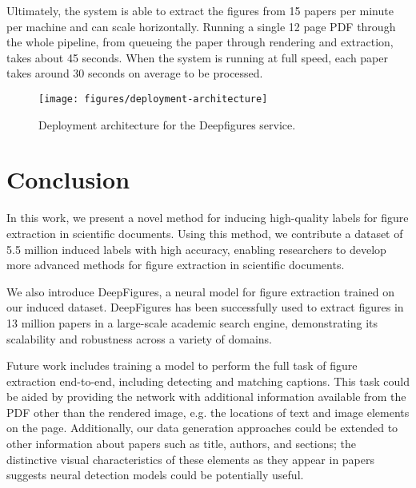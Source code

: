\documentclass[sigconf]{acmart}
\begin{document}
Ultimately, the system is able to extract the figures from 15 papers per minute per machine and can scale horizontally. Running a single 12 page PDF through the whole pipeline, from queueing the paper through rendering and extraction, takes about 45 seconds. When the system is running at full speed, each paper takes around 30 seconds on average to be processed.

\begin{figure}
\texttt{[image: figures/deployment-architecture]}
\caption{Deployment architecture for the Deepfigures service.}
\label{fig:deployment-architecture}
\end{figure}
\section{Conclusion} 
In this work, we present a novel method for inducing high-quality labels for figure extraction in scientific documents.
Using this method, we contribute a dataset of 5.5 million induced labels with high accuracy, enabling researchers to develop more advanced methods for figure extraction in scientific documents.

We also introduce DeepFigures, a neural model for figure extraction trained on our induced dataset. DeepFigures has been successfully used to extract figures in 13 million papers in a large-scale academic search engine, demonstrating its scalability and robustness across a variety of domains.

Future work includes training a model to perform the full task of figure extraction end-to-end, including detecting and matching captions. This task could be aided by providing the network with additional information available from the PDF other than the rendered image, e.g. the locations of text and image elements on the page. Additionally, our data generation approaches could be extended to other information about papers such as title, authors, and sections; the distinctive visual characteristics of these elements as they appear in papers suggests neural detection models could be potentially useful.



\balance
 
\end{document}

